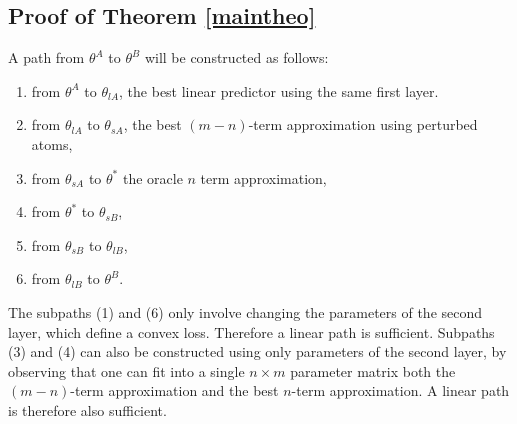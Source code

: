 \subsection{Proof of Theorem \ref{maintheo}}

A path from $\theta^A$ to $\theta^B$ will be constructed 
as follows:
\begin{enumerate}
\item from $\theta^A$ to $\theta_{lA}$, the 
best linear predictor using the same first layer. 
\item from $\theta_{lA}$ to $\theta_{sA}$, the best $(m-n)$-term approximation using perturbed 
atoms, 
\item from $\theta_{sA}$ to $\theta^*$ the oracle $n$ term approximation,  
\item from $\theta^*$ to $\theta_{sB}$,
\item from $\theta_{sB}$ to $\theta_{lB}$,
\item from $\theta_{lB}$ to $\theta^{B}$.
\end{enumerate}
The subpaths (1) and (6) only involve changing the parameters of the second layer, 
which define a convex loss. Therefore a linear path is sufficient.
Subpaths (3) and (4) can also be constructed using only parameters of the second layer, 
by observing that one can fit into a single $n \times m$ parameter matrix both the 
$(m-n)$-term approximation and the best $n$-term approximation. A linear path is therefore 
also sufficient. 

